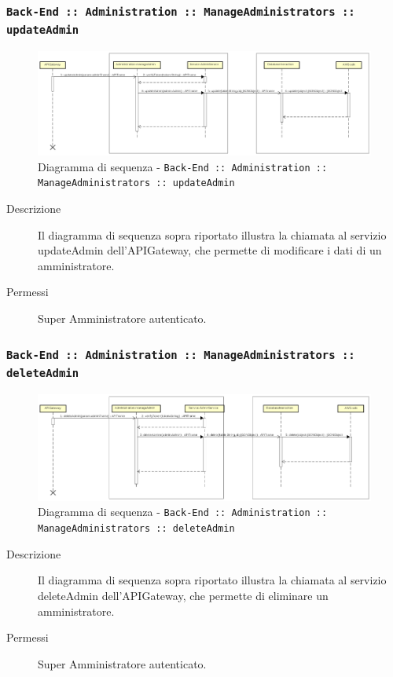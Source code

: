 \documentclass[../DefinizioneDiProdotto.tex]{subfiles}
\begin{document}
		\newpage
		\subsubsection{\texttt{Back-End :: Administration :: ManageAdministrators :: updateAdmin}}
		\begin{figure}[!h]
			\centering
			\includegraphics[width=\textwidth]{DiagrammiSequenza/Back-End/manageAdministrators/updateAdmin.png}
			\caption{Diagramma di sequenza - \texttt{Back-End :: Administration :: ManageAdministrators :: updateAdmin }}
		\end{figure}
		\begin{description}
			\item [Descrizione] Il diagramma di sequenza sopra riportato illustra la chiamata al servizio updateAdmin dell'APIGateway, che permette di modificare i dati di un amministratore.
			\item [Permessi] Super Amministratore autenticato.
		\end{description}

		\subsubsection{\texttt{Back-End :: Administration :: ManageAdministrators :: deleteAdmin}}
		\begin{figure}[!h]
			\centering
			\includegraphics[width=\textwidth]{DiagrammiSequenza/Back-End/manageAdministrators/deleteAdmin.png}
			\caption{Diagramma di sequenza - \texttt{Back-End :: Administration :: ManageAdministrators :: deleteAdmin }}
		\end{figure}
		\begin{description}
			\item [Descrizione] Il diagramma di sequenza sopra riportato illustra la chiamata al servizio deleteAdmin dell'APIGateway, che permette di eliminare un amministratore.
			\item [Permessi] Super Amministratore autenticato.
		\end{description}
\end{document}
